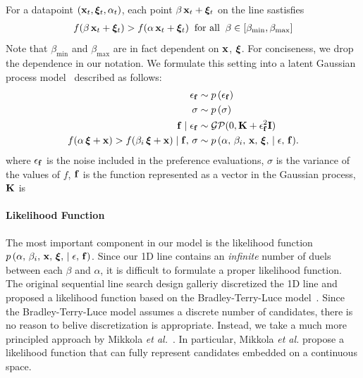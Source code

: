 For a datapoint \( (\mathbf{x}_t, \bm{\xi}_t, \alpha_t) \), each point \(\beta\,\mathbf{x}_t + \bm{\xi}_t\) on the line sastisfies
\begin{align}
f(\beta\,\mathbf{x}_t + \bm{\xi}_t ) > f(\alpha\,\mathbf{x}_t + \bm{\xi}_t) \;\;\text{for all}\;\; \beta \in [\beta_{\mathrm{min}}, \beta_{\mathrm{max}}]
\end{align}
Note that \(\beta_{\mathrm{min}}\) and \(\beta_{\mathrm{max}}\) are in fact dependent on \(\mathbf{x}\), \(\bm{\xi}\).
For conciseness, we drop the dependence in our notation.
We formulate this setting into a latent Gaussian process model~\cite{rasmussen_gaussian_2006} described as follows:
\begin{align}
\epsilon_{\mathbf{f}}           &\sim p\,(\epsilon_{\mathbf{f}}) \\
\sigma                  &\sim p\,(\sigma) \\
\mathbf{f} \mid \epsilon_{\mathbf{f}}  &\sim \mathcal{GP}(0, \mathbf{K} + \epsilon_{\mathbf{f}}^2\mathbf{I}) \\
  f(\alpha\,\bm{\xi} + \mathbf{x}) > f(\beta_i \,\bm{\xi} + \mathbf{x}) \mid \mathbf{f},\, \sigma
  &\sim p\,(\alpha,\, \beta_i,\, \mathbf{x},\,\bm{\xi},\, \mid \epsilon,\, \mathbf{f}). 
\end{align}
where \(\epsilon_{\mathbf{f}}\) is the noise included in the preference evaluations, \(\sigma\) is the variance of the values of \(f\), \(\mathbf{f}\) is the function represented as a vector in the Gaussian process, \(\mathcal{\mathbf{K}}\) is 

\paragraph{Likelihood Function}
The most important component in our model is the likelihood function \(p\,(\alpha,\, \beta_i,\, \mathbf{x},\,\bm{\xi},\, \mid \epsilon,\, \mathbf{f})\).
Since our 1D line contains an \textit{infinite} number of duels between each \(\beta\) and \(\alpha\), it is difficult to formulate a proper likelihood function.
The original sequential line search design galleriy discretized the 1D line and proposed a likelihood function based on the Bradley-Terry-Luce model~\cite{10.1145/3072959.3073598}.
Since the Bradley-Terry-Luce model assumes a discrete number of candidates, there is no reason to belive discretization is appropriate.
Instead, we take a much more principled approach by Mikkola \textit{et al.}~\cite{pmlr-v119-mikkola20a}.
In particular, Mikkola \textit{et al.} propose a likelihood function that can fully represent candidates embedded on a continuous space.

